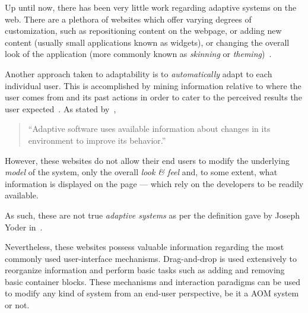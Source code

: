 Up until now, there has been very little work regarding adaptive systems on the web. There are a plethora of websites which offer varying degrees of customization, such as repositioning content on the webpage, or adding new content (usually small applications known as widgets), or changing the overall look of the application (more commonly known as \emph{skinning} or \emph{theming})~\cite{igoogle, pageflakes, protopage, webwag}.

Another approach taken to adaptability is to \emph{automatically} adapt to each individual user. This is accomplished by mining information relative to where the user comes from and its past actions in order to cater to the perceived results the user expected~\cite{GGGR09}. As stated by~\cite{NC}, 

\begin{quote}
  ``Adaptive software uses available information about changes in its environment to improve its behavior.''
\end{quote}

However, these websites do not allow their end users to modify the underlying \emph{model} of the system, only the overall \emph{look \& feel} and, to some extent, what information is displayed on the page --- which rely on the developers to be readily available.

As such, these are not true \emph{adaptive systems} as per the definition gave by Joseph Yoder in~\cite{YJ02}.

Nevertheless, these websites possess valuable information regarding the most commonly used user-interface mechanisms. Drag-and-drop is used extensively to reorganize information and perform basic tasks such as adding and removing basic container blocks. These mechanisms and interaction paradigms can be used to modify any kind of system from an end-user perspective, be it a AOM system or not.
